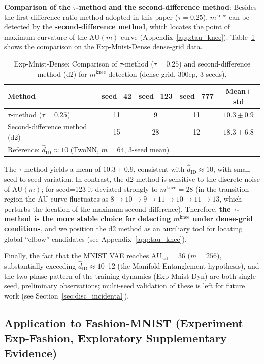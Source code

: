 \documentclass[make,article,submit,pdftex,moreauthors]{Definitions/mdpi}
\newcommand{\AUsat}{\mathrm{AU}_{\mathrm{sat}}}
\newcommand{\mknee}{m^{\mathrm{knee}}}
\begin{document}
\noindent
\textbf{Comparison of the $\tau$-method and the second-difference method}:
Besides the first-difference ratio method adopted in this paper ($\tau = 0.25$), $\mknee$ can
be detected by the \textbf{second-difference method}, which locates the point of maximum
curvature of the AU$(m)$ curve (Appendix~\ref{app:tau_knee}).
Table~\ref{tab:el_knee_compare} shows the comparison on the Exp-Mnist-Dense dense-grid data.

\begin{table}[H]
\centering
\caption{Exp-Mnist-Dense: Comparison of $\tau$-method ($\tau=0.25$) and second-difference method (d2) for $\mknee$ detection (dense grid, 300ep, 3 seeds).}
\label{tab:el_knee_compare}
\small
\begin{tabular}{lcccc}
\toprule
Method & seed=42 & seed=123 & seed=777 & Mean$\pm$std \\
\midrule
$\tau$-method ($\tau=0.25$) & 11 & 9  & 11 & $10.3 \pm 0.9$ \\
Second-difference method (d2) & 15 & 28 & 12 & $18.3 \pm 6.8$ \\
\midrule
\multicolumn{5}{l}{Reference: $\hat{d}_\mathrm{ID} \approx 10$ (TwoNN, $m=64$, 3-seed mean)} \\
\bottomrule
\end{tabular}
\end{table}

The $\tau$-method yields a mean of $10.3 \pm 0.9$, consistent with
$\hat{d}_\mathrm{ID} \approx 10$, with small seed-to-seed variation.
In contrast, the d2 method is sensitive to the discrete noise of AU$(m)$; for seed=123 it
deviated strongly to $\mknee = 28$ (in the transition region the AU curve fluctuates as
$8 \to 10 \to 9 \to 11 \to 10 \to 11 \to 13$, which perturbs the location of the maximum
second difference).
Therefore, \textbf{the $\tau$-method is the more stable choice for detecting $\mknee$ under
dense-grid conditions}, and we position the d2 method as an auxiliary tool for locating
global ``elbow'' candidates (see Appendix~\ref{app:tau_knee}).

Finally, the fact that the MNIST VAE reaches $\AUsat = 36$ ($m=256$), substantially exceeding
$\hat{d}_\mathrm{ID} \approx 10$--12 (the Manifold Entanglement hypothesis), and the
two-phase pattern of the training dynamics (Exp-Mnist-Dyn) are both single-seed, preliminary
observations; multi-seed validation of these is left for future work
(see Section~\ref{sec:disc_incidental}).
\subsection{Application to Fashion-MNIST (Experiment Exp-Fashion, Exploratory Supplementary Evidence)}\label{sec:exp_fashion}
\end{document}
